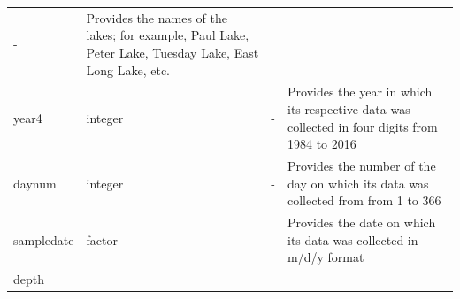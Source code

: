 \documentclass[12pt,]{article}
\begin{document}
\begin{longtable}[]{@{}llll@{}}
\begin{minipage}[t]{0.12\columnwidth}
-\strut
\end{minipage} & \begin{minipage}[t]{0.38\columnwidth}\raggedright
Provides the names of the lakes; for example, Paul Lake, Peter Lake,
Tuesday Lake, East Long Lake, etc.\strut
\end{minipage}\tabularnewline
\begin{minipage}[t]{0.24\columnwidth}\raggedright
year4\strut
\end{minipage} & \begin{minipage}[t]{0.15\columnwidth}\raggedright
integer\strut
\end{minipage} & \begin{minipage}[t]{0.12\columnwidth}\raggedright
-\strut
\end{minipage} & \begin{minipage}[t]{0.38\columnwidth}\raggedright
Provides the year in which its respective data was collected in four
digits from 1984 to 2016\strut
\end{minipage}\tabularnewline
\begin{minipage}[t]{0.24\columnwidth}\raggedright
daynum\strut
\end{minipage} & \begin{minipage}[t]{0.15\columnwidth}\raggedright
integer\strut
\end{minipage} & \begin{minipage}[t]{0.12\columnwidth}\raggedright
-\strut
\end{minipage} & \begin{minipage}[t]{0.38\columnwidth}\raggedright
Provides the number of the day on which its data was collected from from
1 to 366\strut
\end{minipage}\tabularnewline
\begin{minipage}[t]{0.24\columnwidth}\raggedright
sampledate\strut
\end{minipage} & \begin{minipage}[t]{0.15\columnwidth}\raggedright
factor\strut
\end{minipage} & \begin{minipage}[t]{0.12\columnwidth}\raggedright
-\strut
\end{minipage} & \begin{minipage}[t]{0.38\columnwidth}\raggedright
Provides the date on which its data was collected in m/d/y format\strut
\end{minipage}\tabularnewline
\begin{minipage}[t]{0.24\columnwidth}\raggedright
depth\strut

\end{minipage}
\end{longtable}
\end{document}

